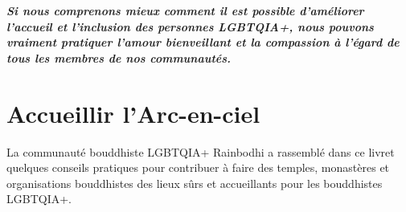 \documentclass[12pt,openany]{book}
\renewenvironment{quote}{%
  \list{}{%
    \leftmargin-0.1cm   %
    \rightmargin\leftmargin
  }
  \item\relax
}
{\endlist}
\begin{document}
\medskip

\begin{figure}[h]
    \centering
\end{figure}

\begingroup
\begin{quote}
\centering
\doublespacing
\textit{\Large \textbf{Si nous comprenons mieux comment il est possible d'améliorer l'accueil et l'inclusion des personnes \mbox{LGBTQIA+}, nous pouvons vraiment pratiquer l'amour bienveillant et la compassion à l'égard de tous les membres de nos communautés.}}
\end{quote}
\endgroup
\color{black}

\setlength{\parindent}{15pt}
\chapter*{Accueillir l’Arc-en-ciel}

\begin{figure}
\end{figure}
\noindent La communauté bouddhiste \mbox{LGBTQIA+} Rainbodhi a rassemblé dans ce livret quelques conseils pratiques pour contribuer à faire des temples, monastères et organisations bouddhistes des lieux sûrs et accueillants pour les bouddhistes \mbox{LGBTQIA+}.
\end{document}
